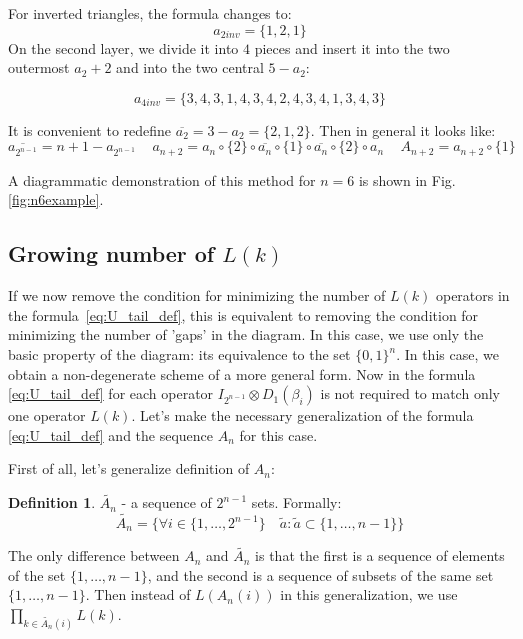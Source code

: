 \documentclass[a4paper, openany, 12pt]{article}
\theoremstyle{remark}
\theoremstyle{definition}
\newtheorem{definition}{Definition}[section]
\newcommand{\ot}{\otimes}
\begin{document}
For inverted triangles, the formula changes to:
\begin{equation}
    a_{2inv} = \{1,2,1\}
\end{equation}
On the second layer, we divide it into $4$ pieces and insert it into the two outermost $a_2+2$ and into the two central $5-a_2$:

\begin{equation}
    a_{4inv} = \{3,4,3,1,4,3,4,2,4,3,4,1,3,4,3\}
\end{equation}

It is convenient to redefine $\overline{a_2} = 3-a_2 =\{2,1,2\}$. Then in general it looks like:
\begin{equation}
    \overline{a_{2^{n-1}}} = n+1-a_{2^{n-1}}\,\quad a_{n+2} = a_n\circ\{2\}\circ\overline{a_n}\circ\{1\}\circ\overline{a_n}\circ\{2\} \circ a_n\,\quad A_{n+2} = a_{n+2}\circ\{1\}
\end{equation}

A diagrammatic demonstration of this method for $n = 6$ is shown in Fig. \ref{fig:n6example}.




\subsection{Growing number of $L(k)$ }
If we now remove the condition for minimizing the number of $L(k)$ operators in the formula~\eqref{eq:U_tail_def}, this is equivalent to removing the condition for minimizing the number of 'gaps' in the diagram.
In this case, we use only the basic property of the diagram: its equivalence to the set $\{0,1\}^n$.
In this case, we obtain a non-degenerate scheme of a more general form. Now in the formula \eqref{eq:U_tail_def} for each operator $I_{2^{n-1}}\ot D_1(\beta_i)$ is not required to match only one operator $L(k)$. Let's make the necessary generalization of the formula \eqref{eq:U_tail_def} and the sequence $A_n$ for this case.

First of all, let's generalize definition of $A_n$:
\begin{definition}
    $\widetilde{A_n}$ - a sequence of $2^{n-1}$ sets. Formally:
    \begin{equation}
        \widetilde{A_n} = \{\forall i\in\{1,\dots,2^{n-1}\}\quad\widetilde{a}: \widetilde{a}\subset \{1,\dots,n-1\}\}
    \end{equation}
\end{definition}

The only difference between ${A_n}$ and $\widetilde{A_n}$ is that the first is a sequence of elements of the set $\{1,\dots,n-1\}$, and the second is a sequence of subsets of the same set $\{1,\dots,n-1\}$. Then instead of $L(A_n(i))$ in this generalization, we use $\prod_{k\in\widetilde{A_n}(i)}L(k)$.
\end{document}
